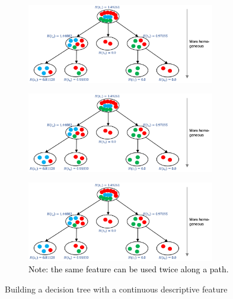 \begin{figure}[h]
  \centering
  \begin{subfigure}{0.45\textwidth}
    \centering
    \includegraphics[width=0.9\textwidth]{assets/trees/cont/descriptive_possible.png}
  \end{subfigure}
  \begin{subfigure}{0.45\textwidth}
    \centering
    \includegraphics[width=0.9\textwidth]{assets/trees/cont/descriptive_decision.png}
  \end{subfigure}

  \begin{subfigure}{0.6\textwidth}
    \centering
    \includegraphics[width=0.9\textwidth]{assets/trees/cont/descriptive_final_trees.png}
    \textcolor{black}{\footnotesize Note: the same feature can be used twice along a path.}
  \end{subfigure}
  \caption{Building a decision tree with a continuous descriptive feature}
  \label{fig:3_cont_descriptive_feature}
\end{figure}


